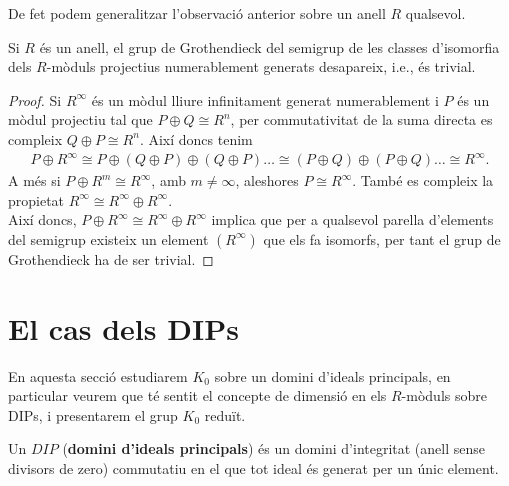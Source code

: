 De fet podem generalitzar l'observació anterior sobre un anell $R$ qualsevol.

\begin{prop}
Si $R$ és un anell, el grup de Grothendieck del semigrup de les classes d'isomorfia dels $R$-mòduls projectius numerablement generats desapareix, i.e., és trivial.
\end{prop}

\begin{proof}
Si $R^\infty$ és un mòdul lliure infinitament generat numerablement i $P$ és un mòdul projectiu tal que $P\oplus Q \cong R^n$,  per commutativitat de la suma directa es compleix $Q \oplus P \cong R^n$. Així doncs tenim 
\begin{eqnarray*}
P\oplus R^\infty  \cong  P\oplus(Q\oplus P) \oplus (Q \oplus P) \dots 
 \cong  (P \oplus Q) \oplus (P \oplus Q) \dots 
\cong  R^\infty .
\end{eqnarray*}
A més si $P\oplus R^m \cong R^\infty$, amb $m\neq \infty$, aleshores $P\cong R^\infty$. També es compleix la propietat $R^\infty \cong R^\infty \oplus R^\infty$. \\
Així doncs, $P\oplus R^\infty \cong R^\infty \oplus R^\infty$ implica que per a qualsevol parella d'elements del semigrup existeix un element $(R^{\infty})$ que els fa isomorfs, per tant el grup de Grothendieck ha de ser trivial.
\end{proof}




\section{El cas dels DIPs}
En aquesta secció estudiarem $K_0$ sobre un domini d'ideals principals, en particular veurem que té sentit el concepte de dimensió en els $R$-mòduls sobre DIPs, i presentarem el grup $K_0$ reduït.

\begin{definition}{} Un $DIP$ (\textbf{domini d'ideals principals}) és un domini d'integritat (anell sense divisors de zero) commutatiu en el que tot ideal és generat per un únic element.
\end{definition}

